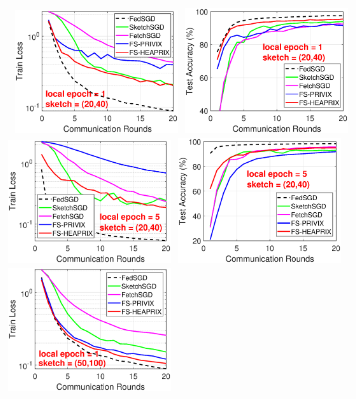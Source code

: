 \documentclass{article}
\begin{document}
\begin{figure}[t]
	\begin{center}
		\mbox{\hspace{-0.1in}			  
		 \includegraphics[width=1.7in]{MNIST_figures/local1_sketch20_iid1_train_loss.eps} \hspace{-0.12in}
		 \includegraphics[width=1.7in]{MNIST_figures/local1_sketch20_iid1_test_acc.eps} 
		 }
		\mbox{\hspace{-0.15in}	
		\includegraphics[width=1.7in]{MNIST_figures/local5_sketch20_iid1_train_loss.eps}\hspace{-0.12in}
		\includegraphics[width=1.7in]{MNIST_figures/local5_sketch20_iid1_test_acc.eps}
		}
		\mbox{\hspace{-0.15in}	
		\includegraphics[width=1.7in]{MNIST_figures/local1_sketch50_iid1_train_loss.eps} \hspace{-0.12in}
}
\end{center}
\end{figure}
\end{document}
